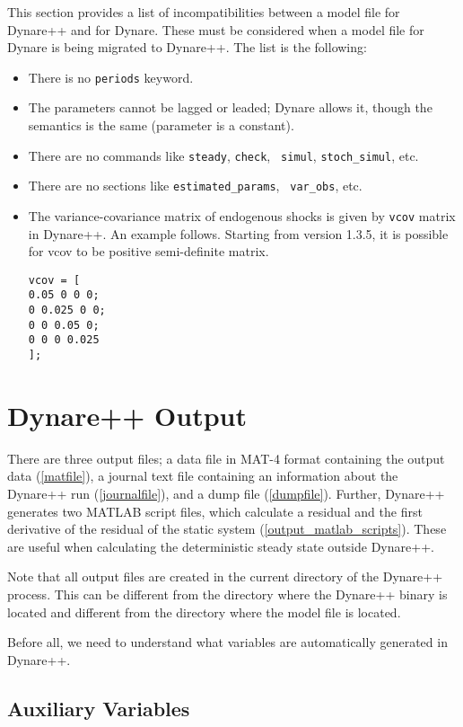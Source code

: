 \documentclass[10pt]{article}
\begin{document}
This section provides a list of incompatibilities between a model file
for Dy\-na\-re++ and for Dynare. These must be considered when a model
file for Dynare is being migrated to Dynare++. The list is the
following:
\begin{itemize}
\item There is no {\tt periods} keyword.
\item The parameters cannot be lagged or leaded; Dynare
allows it, though the semantics is the same (parameter is a
constant).
\item There are no commands like {\tt steady}, {\tt check}, {\tt
simul}, {\tt stoch\_simul}, etc.
\item There are no sections like {\tt estimated\_params}, {\tt
var\_obs}, etc.
\item The variance-covariance matrix of endogenous shocks is given by
{\tt vcov} matrix in Dynare++. An example follows. Starting from
version 1.3.5, it is possible for vcov to be positive semi-definite
matrix.
{\small
\begin{verbatim}
vcov = [
0.05 0 0 0;
0 0.025 0 0;
0 0 0.05 0;
0 0 0 0.025
];
\end{verbatim}
}

\end{itemize}

\section{Dynare++ Output}

There are three output files; a data file in MAT-4 format containing
the output data (\ref{matfile}), a journal text file containing an
information about the Dynare++ run (\ref{journalfile}), and a dump
file (\ref{dumpfile}). Further, Dynare++ generates two MATLAB script
files, which calculate a residual and the first derivative of the
residual of the static system (\ref{output_matlab_scripts}). These are
useful when calculating the deterministic steady state outside
Dynare++.

Note that all output files are created in the current directory of
the Dynare++ process. This can be different from the directory where
the Dynare++ binary is located and different from the directory where
the model file is located.

Before all, we need to understand what variables are automatically
generated in Dynare++.

\subsection{Auxiliary Variables}
\label{aux_var}
\end{document}
